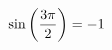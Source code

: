 \documentclass[preview]{standalone}
\begin{document}
\begin{align*}
\special{dvisvgm:raw <g id='unique000'>}\sin\left(\frac{3\pi}{2}\right) = -1\special{dvisvgm:raw </g>}
\end{align*}
\end{document}

